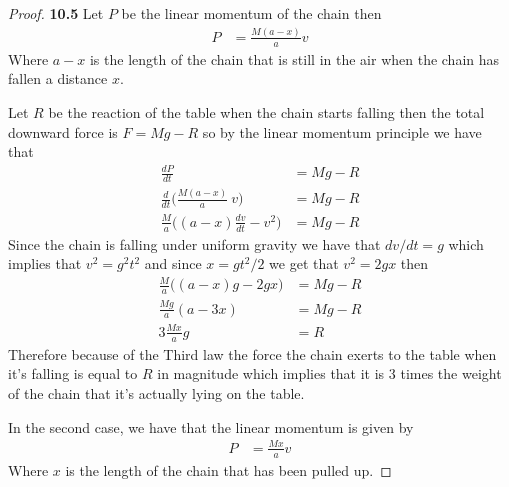 \documentclass[11pt]{article}
\theoremstyle{definition}
\begin{document}
\cleardoublepage
	\begin{proof}{\textbf{10.5}}
        Let $P$ be the linear momentum of the chain then
        \begin{align*}
            P &= \frac{M(a-x)}{a} v
        \end{align*}
        Where $a-x$ is the length of the chain that is still in the air when
        the chain has fallen a distance $x$.

        Let $R$ be the reaction of the table when the chain starts falling then
        the total downward force is $F = Mg - R$ so by the linear momentum
        principle we have that
        \begin{align*}
            \frac{dP}{dt} &= Mg - R\\
            \frac{d}{dt}\bigg(\frac{M(a - x)}{a}~v\bigg) &= Mg - R\\
            \frac{M}{a}\bigg((a - x)\frac{dv}{dt} - v^2\bigg) &= Mg - R
        \end{align*}
        Since the chain is falling under uniform gravity we have that
        $dv/dt = g$ which implies that $v^2 = g^2t^2$ and since $x = gt^2/2$
        we get that $v^2 = 2gx$ then
        \begin{align*}
            \frac{M}{a}\bigg((a - x)g - 2gx\bigg) &= Mg - R\\
            \frac{Mg}{a}(a - 3x) &= Mg - R\\
            3\frac{Mx}{a}g &= R
        \end{align*}
        Therefore because of the Third law the force the chain exerts to
        the table when it's falling is equal to $R$ in magnitude which implies
        that it is 3 times the weight of the chain that it's actually lying on
        the table.

        In the second case, we have that the linear momentum is given by
        \begin{align*}
            P &= \frac{Mx}{a} v
        \end{align*}
        Where $x$ is the length of the chain that has been pulled up.


\end{proof}
\end{document}
